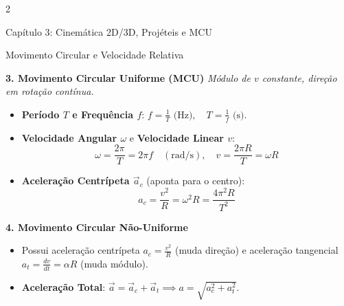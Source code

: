 \documentclass[9pt,a4paper]{article}
\begin{document}
\begin{multicols*}{2}
\begin{topicbox}{Capítulo 3: Cinemática 2D/3D, Projéteis e MCU}
\begin{center}
\end{center}

\end{topicbox}

\begin{topicbox}{Movimento Circular e Velocidade Relativa}

\textbf{3. Movimento Circular Uniforme (MCU)}
\textit{Módulo de $v$ constante, direção em rotação contínua.}
\begin{itemize}[leftmargin=*,itemsep=0pt]
    \item \textbf{Período $T$ e Frequência $f$}: $f = \frac{1}{T} \text{ (Hz)}, \quad T = \frac{1}{f} \text{ (s)}$.
    \item \textbf{Velocidade Angular $\omega$} e \textbf{Velocidade Linear $v$}:
    \begin{equation*}
        \omega = \frac{2\pi}{T} = 2\pi f \quad (\text{rad/s}), \quad v = \frac{2\pi R}{T} = \omega R
    \end{equation*}
    \item \textbf{Aceleração Centrípeta $\vec{a}_c$} (aponta para o centro):
    \begin{equation*}
        a_c = \frac{v^2}{R} = \omega^2 R = \frac{4\pi^2 R}{T^2}
    \end{equation*}
\end{itemize}

\textbf{4. Movimento Circular Não-Uniforme}
\begin{itemize}[leftmargin=*,itemsep=0pt]
    \item Possui aceleração centrípeta $a_c = \frac{v^2}{R}$ (muda direção) e aceleração tangencial $a_t = \frac{dv}{dt} = \alpha R$ (muda módulo).
    \item \textbf{Aceleração Total}: $\vec{a} = \vec{a}_c + \vec{a}_t \implies a = \sqrt{a_c^2 + a_t^2}$.
\end{itemize}


\end{topicbox}
\end{multicols*}
\end{document}

